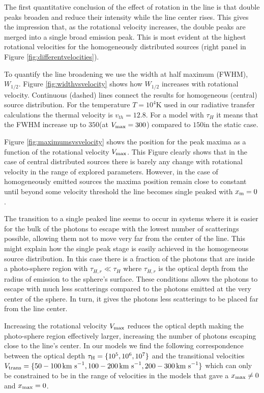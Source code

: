 \documentclass{emulateapj}
\newcommand{\ly}{{\ifmmode{{\rm Ly}\alpha~}\else{Ly$\alpha$~}\fi}}
\newcommand{\kms}{{\ifmmode{{\mathrm{\,km\ s}^{-1}}}\else{\,km~s$^{-1}$}\fi}}
\begin{document}
The first quantitative conclusion of the effect of rotation in the
\ly line is that double peaks broaden and reduce their intensity
while the line center rises. This gives the impression that, as the
rotational velocity increases, the double peaks are merged into a
single broad emission peak. This is most evident at the highest
rotational velocities for the homogeneously distributed sources
(right panel in Figure \ref{fig:differentvelocities}). 

To quantify the line broadening we use the width at half maximum
(FWHM), $W_{1/2}$. Figure \ref{fig:widthvsvelocity} shows how $W_{1/2}$ increases
with rotational velocity. Continuous (dashed) lines connect the
results for homogeneous (central) source distribution. For the
temperature $T=10^4$K used in our radiative transfer calculations the
thermal velocity is $v_{th}=12.8$\kms. For a model with $\tau_{H}$ it
means that the FWHM increase up to $350$\kms (at $V_{\rm
  max}=300$\kms) compared to $150$\kms in the static case. 
 

Figure \ref{fig:maximumsvsvelocity} shows the position for the peak
maxima as a function of the rotational velocity $V_{\rm max}$. This
Figure clearly shows that in the case of central distributed
sources there is barely any change with rotational velocity in the
range of explored parameters. However, in the case of
homogeneously emitted sources the maxima position remain close to
constant until beyond some velocity threshold the line becomes single
peaked with $x_{\rm m}=0$ \kms. 

The transition to a single peaked line seems to occur in systems
where it is easier for the bulk of the photons to escape with the lowest
number of scatterings possible, allowing them not to move very far
from the center of the line. This might explain how the single peak stage
is easily achieved in the homogeneous source distribution. In this
case there is a fraction of the photons that are inside a photo-sphere
region with $\tau_{H,r}\ll \tau_{H}$ where $\tau_{H,r}$ is the optical
depth from the radius of emission to the sphere's surface. These
conditions allows the photons to escape with much less scatterings
compared to the photons emitted at the very center of the sphere. In
turn, it gives the photons less scatterings to be placed far from the
line center. 

Increasing the rotational velocity $V_{\rm max}$ reduces
the optical depth making the photo-sphere region effectively larger,
increasing the number of photons escaping close to the line's
center. In our models we find the following correspondence between the
optical depth $\tau_{\rm H}=\{10^5, 10^6, 10^7\}$ and the transitional
velocities $V_{\rm   trans}=\{50-100\kms, 100-200\kms, 200-300\kms\}$
which can only be constrained to be in the range of velocities in the
models that gave a $x_{\rm max}\neq 0$ and $x_{\rm max}=0$.  
\end{document}
